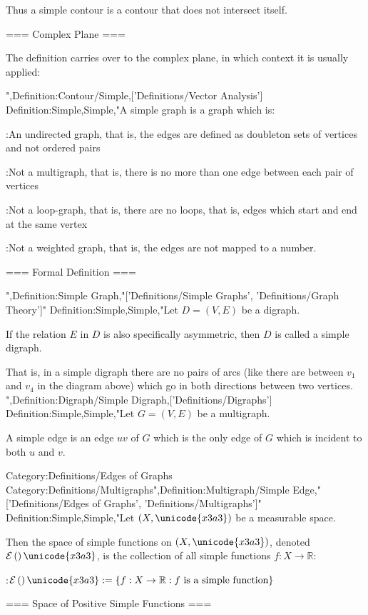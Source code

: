 Thus a simple contour is a contour that does not intersect itself.


=== Complex Plane ===

The definition carries over to the complex plane, in which context it is usually applied:

",Definition:Contour/Simple,['Definitions/Vector Analysis']
Definition:Simple,Simple,"A simple graph is a graph which is:

:An undirected graph, that is, the edges are defined as doubleton sets of vertices and not ordered pairs

:Not a multigraph, that is, there is no more than one edge between each pair of vertices

:Not a loop-graph, that is, there are no loops, that is, edges which start and end at the same vertex

:Not a weighted graph, that is, the edges are not mapped to a number.


=== Formal Definition ===

",Definition:Simple Graph,"['Definitions/Simple Graphs', 'Definitions/Graph Theory']"
Definition:Simple,Simple,"Let $D = \left( V, E \right)$ be a digraph.

If the relation $E$ in $D$ is also specifically asymmetric, then $D$ is called a simple digraph.

That is, in a simple digraph there are no pairs of arcs (like there are between $v_1$ and $v_4$ in the diagram above) which go in both directions between two vertices.
",Definition:Digraph/Simple Digraph,['Definitions/Digraphs']
Definition:Simple,Simple,"Let $G = \left( V, E \right)$ be a multigraph.


A simple edge is an edge $u v$ of $G$ which is the only edge of $G$ which is incident to both $u$ and $v$.


Category:Definitions/Edges of Graphs
Category:Definitions/Multigraphs",Definition:Multigraph/Simple Edge,"['Definitions/Edges of Graphs', 'Definitions/Multigraphs']"
Definition:Simple,Simple,"Let $\left( X, \unicode{x3a3} \right)$ be a measurable space.

Then the space of simple functions on $\left( X, \unicode{x3a3} \right)$, denoted $\mathcal E \left(   \right)\unicode{x3a3}$, is the collection of all simple functions $f: X \to \mathbb R$:

:$\mathcal E \left(   \right)\unicode{x3a3} := \left\lbrace f: X \to \mathbb R: \text{$f$ is a simple function}  \right\rbrace$


=== Space of Positive Simple Functions ===

